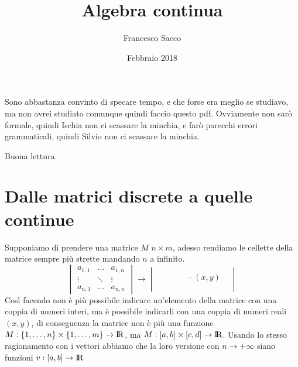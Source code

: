 \documentclass[11pt,a4paper]{article}
\date{Febbraio 2018}
\title{Algebra continua}
\author{Francesco Sacco}
\theoremstyle{definition}
\theoremstyle{plain}
\theoremstyle{plain}
\begin{document}
	\maketitle
	Sono abbastanza convinto di specare tempo, e che forse era meglio se studiavo, ma non avrei studiato comunque quindi faccio questo pdf.\newline
	Ovviamente non sarò formale, quindi Ischia non ci scassare la minchia, e farò parecchi errori grammaticali, quindi Silvio non ci scassare la minchia.\newline

	Buona lettura.
	

	\section{Dalle matrici discrete a quelle continue}
		Supponiamo di prendere una matrice $M$ $ n \times m$, adesso rendiamo le cellette della matrice sempre più strette mandando $n$ a infinito.
		\begin{equation}
			\begin{vmatrix}
				a_{1,1} & \dots & a_{1,n} \\
				\vdots	&	\ddots&	\vdots	\\
				a_{n,1} & \dots & a_{n,n} 
			\end{vmatrix}
			\longrightarrow
			\begin{vmatrix}
				&\quad & & \\
				&\ &\quad \cdot \, (x,y) & \\
				& & & \\
			\end{vmatrix}
		\end{equation}
		Così facendo non è più possibile indicare un'elemento della matrice con una coppia di numeri interi, ma è possibile indicarli con una coppia di numeri reali $(x,y)$, di  conseguenza la matrice non è più una funzione $M:\{1,\dots,n\}\times\{1,\dots,m\} \rightarrow \rm I\!R$, ma $M:[a,b]\times [c,d]\rightarrow \rm I\!R$.\newline
		Usando lo stesso ragionamento con i vettori abbiamo che la loro versione con $n\rightarrow +\infty$ siano funzioni $v:[a,b]\rightarrow \rm I\!R$ 
	
\end{document}
